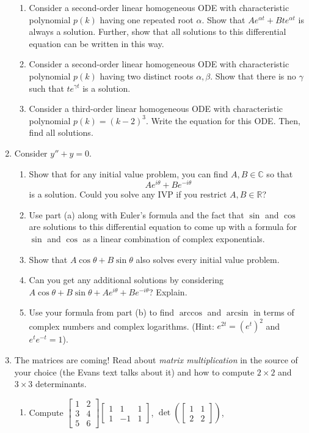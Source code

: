 \documentclass[letter]{article}
\newcommand{\R}{\mathbb{R}}
\newcommand{\C}{\mathbb{C}}
\newcommand{\mat}[1]{\begin{bmatrix}#1\end{bmatrix}}
\begin{document}
\begin{enumerate}
\begin{enumerate}
			\item Consider a second-order linear homogeneous ODE with 
				characteristic polynomial $p(k)$ having one repeated root $\alpha$.  
				Show that $Ae^{\alpha t}+Bte^{\alpha t}$ is always a solution.  Further, show that
				all solutions to this differential equation can be written in this way.
			\item Consider a second-order linear homogeneous ODE with 
				characteristic polynomial $p(k)$ having two distinct roots $\alpha,\beta$.  
				Show that there is no $\gamma$ such that $te^{\gamma t}$ is a solution.
			\item Consider a third-order linear homogeneous ODE with 
				characteristic polynomial $p(k)=(k-2)^3$.  
				Write the equation for this ODE.  Then, find all solutions.
		\end{enumerate}
	\item Consider $y''+y=0$.
		\begin{enumerate}
			\item Show that for any initial value problem, you can find $A,B\in \C$ so that
				\[
					Ae^{i\theta}+Be^{-i\theta}
				\]
				is a solution.  Could you solve any IVP if you restrict $A,B\in\R$?
			\item Use part (a) along with Euler's formula and the fact that $\sin$ and $\cos$ are solutions
				to this differential equation to come up with a formula for $\sin$ and $\cos$ as a linear
				combination of complex exponentials.
			\item Show that $A\cos \theta+B\sin\theta$ also solves every initial value problem.
			\item Can you get any additional solutions by considering $A\cos \theta+B\sin\theta +Ae^{i\theta}+Be^{-i\theta}$?
				Explain.
			\item Use your formula from part (b) to find $\arccos$ and $\arcsin$ in terms of complex numbers and complex
				logarithms.  (Hint: $e^{2t}=(e^t)^2$ and $e^te^{-t}=1$).
		\end{enumerate}
	\item The matrices are coming!  Read about \emph{matrix multiplication} in the source of your choice (the Evans
		text talks about it) and how to compute $2\times 2$ and $3\times 3$ determinants.
		\begin{enumerate}
			\item Compute $\mat{1&2\\3&4\\5&6}\mat{1&1&1\\1&-1&1}$, $\det\left(\mat{1&1\\2&2}\right)$,

\end{enumerate}
\end{enumerate}
\end{document}
